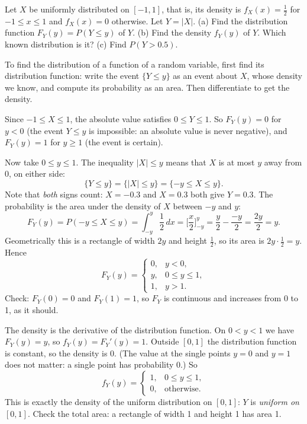 
\begin{problem}
	Let $X$ be uniformly distributed on $[-1,1]$, that is, its density is
	$f_X(x)=\frac12$ for $-1\le x\le1$ and $f_X(x)=0$ otherwise. Let $Y=|X|$.
	(a) Find the distribution function $F_Y(y)=P(Y\le y)$ of $Y$.
	(b) Find the density $f_Y(y)$ of $Y$. Which known distribution is it?
	(c) Find $P(Y>0.5)$.
\end{problem}

\begin{solution}
	\idea To find the distribution of a function of a random variable, first find
	its distribution function: write the event $\{Y\le y\}$ as an event about $X$,
	whose density we know, and compute its probability as an area. Then
	differentiate to get the density.

	 Since $-1\le X\le1$, the absolute value satisfies $0\le Y\le1$.
	So $F_Y(y)=0$ for $y<0$ (the event $Y\le y$ is impossible: an absolute value
	is never negative), and $F_Y(y)=1$ for $y\ge1$ (the event is certain).

	Now take $0\le y\le1$. The inequality $|X|\le y$ means that $X$ is at most
	$y$ away from 0, on either side:
	\[ \{Y\le y\}=\{|X|\le y\}=\{-y\le X\le y\}. \]
	Note that \emph{both} signs count: $X=-0.3$ and $X=0.3$ both give $Y=0.3$.
	The probability is the area under the density of $X$ between $-y$ and $y$:
	\[ F_Y(y)=P(-y\le X\le y)=\int_{-y}^{y}\frac12\,dx
		=\Big[\frac x2\Big]_{-y}^{y}=\frac y2-\frac{-y}{2}=\frac{2y}{2}=y. \]
	Geometrically this is a rectangle of width $2y$ and height $\frac12$, so its
	area is $2y\cdot\frac12=y$. Hence
	\[ F_Y(y)=\begin{cases}
			0, & y<0,         \\
			y, & 0\le y\le1, \\
			1, & y>1.
		\end{cases} \]
	Check: $F_Y(0)=0$ and $F_Y(1)=1$, so $F_Y$ is continuous and increases from
	0 to 1, as it should.

	 The density is the derivative of the distribution function. On
	$0<y<1$ we have $F_Y(y)=y$, so $f_Y(y)=F_Y'(y)=1$. Outside $[0,1]$ the
	distribution function is constant, so the density is 0. (The value at the
	single points $y=0$ and $y=1$ does not matter: a single point has
	probability 0.) So
	\[ f_Y(y)=\begin{cases}
			1, & 0\le y\le1,        \\
			0, & \text{otherwise}.
		\end{cases} \]
	This is exactly the density of the uniform distribution on $[0,1]$: $Y$ is
	\emph{uniform on $[0,1]$}. Check the total area: a rectangle of width 1 and
	height 1 has area 1.


\end{solution}
